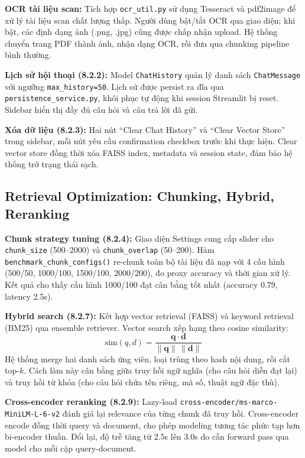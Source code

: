\documentclass[10pt, conference, a4paper, compsocconf]{IEEEtran}
\begin{document}
\textbf{OCR tài liệu scan:} Tích hợp \texttt{ocr\_util.py} sử dụng Tesseract và pdf2image để xử lý tài liệu scan chất lượng thấp. Người dùng bật/tắt OCR qua giao diện; khi bật, các định dạng ảnh (.png, .jpg) cũng được chấp nhận upload. Hệ thống chuyển trang PDF thành ảnh, nhận dạng OCR, rồi đưa qua chunking pipeline bình thường.

\textbf{Lịch sử hội thoại (8.2.2):} Model \texttt{ChatHistory} quản lý danh sách \texttt{ChatMessage} với ngưỡng \texttt{max\_history=50}. Lịch sử được persist ra đĩa qua \texttt{persistence\_service.py}, khôi phục tự động khi session Streamlit bị reset. Sidebar hiển thị đầy đủ câu hỏi và câu trả lời đã gửi.

\textbf{Xóa dữ liệu (8.2.3):} Hai nút ``Clear Chat History'' và ``Clear Vector Store'' trong sidebar, mỗi nút yêu cầu confirmation checkbox trước khi thực hiện. Clear vector store đồng thời xóa FAISS index, metadata và session state, đảm bảo hệ thống trở trạng thái sạch.

\subsection{Retrieval Optimization: Chunking, Hybrid, Reranking}

\textbf{Chunk strategy tuning (8.2.4):} Giao diện Settings cung cấp slider cho \texttt{chunk\_size} (500--2000) và \texttt{chunk\_overlap} (50--200). Hàm \texttt{benchmark\_chunk\_configs()} re-chunk toàn bộ tài liệu đã nạp với 4 cấu hình (500/50, 1000/100, 1500/100, 2000/200), đo proxy accuracy và thời gian xử lý. Kết quả cho thấy cấu hình 1000/100 đạt cân bằng tốt nhất (accuracy 0.79, latency 2.5s).

\textbf{Hybrid search (8.2.7):} Kết hợp vector retrieval (FAISS) và keyword retrieval (BM25) qua ensemble retriever. Vector search xếp hạng theo cosine similarity:
\begin{equation}
\mathrm{sim}(q, d) = \frac{\mathbf{q} \cdot \mathbf{d}}{\|\mathbf{q}\|\,\|\mathbf{d}\|}
\end{equation}
Hệ thống merge hai danh sách ứng viên, loại trùng theo hash nội dung, rồi cắt top-$k$. Cách làm này cân bằng giữa truy hồi ngữ nghĩa (cho câu hỏi diễn đạt lại) và truy hồi từ khóa (cho câu hỏi chứa tên riêng, mã số, thuật ngữ đặc thù).

\textbf{Cross-encoder reranking (8.2.9):} Lazy-load \texttt{cross-encoder/ms-marco-MiniLM-L-6-v2} đánh giá lại relevance của từng chunk đã truy hồi. Cross-encoder encode đồng thời query và document, cho phép modeling tương tác phức tạp hơn bi-encoder thuần. Đổi lại, độ trễ tăng từ 2.5s lên 3.0s do cần forward pass qua model cho mỗi cặp query-document.
\end{document}
